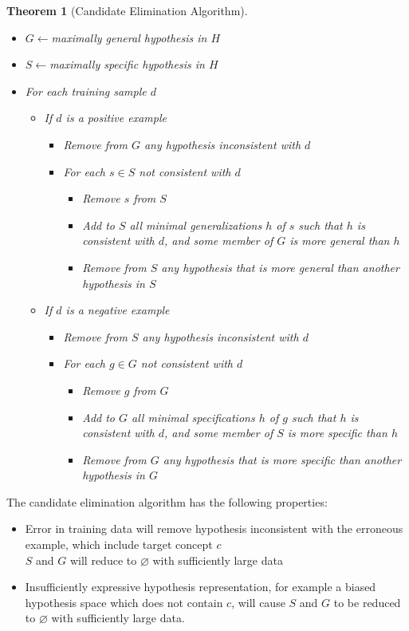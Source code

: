 \documentclass[12pt]{article}
\newtheorem{theorem}{Theorem}[section]
\theoremstyle{definition}
\begin{document}
\begin{theorem}[Candidate Elimination Algorithm]
\hfill\\\normalfont \begin{itemize}
\item $G\leftarrow$maximally general hypothesis in $H$
\item $S\leftarrow$maximally specific hypothesis in $H$
\item For each training sample $d$
\begin{itemize}
	\item If $d$ is a positive example
	\begin{itemize}
		\item Remove from $G$ any hypothesis inconsistent with $d$
		\item For each $s\in S$ not consistent with $d$
		\begin{itemize}
			\item Remove $s$ from $S$
			\item Add to $S$ all minimal generalizations $h$ of $s$ such that $h$ is consistent with $d$, \textit{and} some member of $G$ is more general than $h$
			\item Remove from $S$ any hypothesis that is more general than another hypothesis in $S$
		\end{itemize}
	\end{itemize}
	\item If $d$ is a negative example
	\begin{itemize}
		\item Remove from $S$ any hypothesis inconsistent with $d$
		\item For each $g\in G$ not consistent with $d$
		\begin{itemize}
			\item Remove $g$ from $G$
			\item Add to $G$ all minimal specifications $h$ of $g$ such that $h$ is consistent with $d$, \textit{and} some member of $S$ is more specific than $h$
			\item Remove from $G$ any hypothesis that is more specific than another hypothesis in $G$
		\end{itemize}
	\end{itemize}	
\end{itemize}
\end{itemize}
\end{theorem}
The candidate elimination algorithm has the following properties:
\begin{itemize}
	\item Error in training data will remove hypothesis inconsistent with the erroneous example, which include target concept $c$\\$S$ and $G$ will reduce to $\varnothing$ with sufficiently large data
	\item Insufficiently expressive hypothesis representation, for example a biased hypothesis space which does not contain $c$, will cause $S$ and $G$ to be reduced to $\varnothing$ with sufficiently large data.
\end{itemize}
\end{document}
